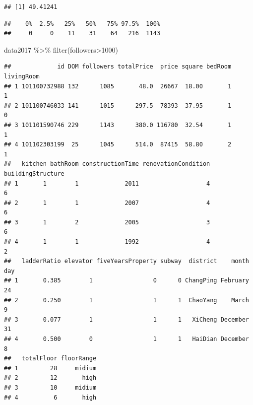 \documentclass[
]{article}
\newenvironment{Shaded}{\begin{snugshade}}{\end{snugshade}}
\newcommand{\DecValTok}[1]{\textcolor[rgb]{0.00,0.00,0.81}{#1}}
\newcommand{\FloatTok}[1]{\textcolor[rgb]{0.00,0.00,0.81}{#1}}
\newcommand{\FunctionTok}[1]{\textcolor[rgb]{0.00,0.00,0.00}{#1}}
\newcommand{\NormalTok}[1]{#1}
\newcommand{\SpecialCharTok}[1]{\textcolor[rgb]{0.00,0.00,0.00}{#1}}
\begin{document}
\begin{Shaded}
\end{Shaded}

\begin{verbatim}
## [1] 49.41241
\end{verbatim}

\begin{Shaded}
\end{Shaded}

\begin{verbatim}
##    0%  2.5%   25%   50%   75% 97.5%  100% 
##     0     0    11    31    64   216  1143
\end{verbatim}

\begin{Shaded}
\begin{Highlighting}[]
\NormalTok{data2017 }\SpecialCharTok{\%\textgreater{}\%} \FunctionTok{filter}\NormalTok{(followers}\SpecialCharTok{\textgreater{}}\DecValTok{1000}\NormalTok{)}
\end{Highlighting}
\end{Shaded}

\begin{verbatim}
##             id DOM followers totalPrice  price square bedRoom livingRoom
## 1 101100732988 132      1085       48.0  26667  18.00       1          1
## 2 101100746033 141      1015      297.5  78393  37.95       1          0
## 3 101101590746 229      1143      380.0 116780  32.54       1          1
## 4 101102303199  25      1045      514.0  87415  58.80       2          1
##   kitchen bathRoom constructionTime renovationCondition buildingStructure
## 1       1        1             2011                   4                 6
## 2       1        1             2007                   4                 6
## 3       1        2             2005                   3                 6
## 4       1        1             1992                   4                 2
##   ladderRatio elevator fiveYearsProperty subway  district    month day
## 1       0.385        1                 0      0 ChangPing February  24
## 2       0.250        1                 1      1  ChaoYang    March   9
## 3       0.077        1                 1      1   XiCheng December  31
## 4       0.500        0                 1      1   HaiDian December   8
##   totalFloor floorRange
## 1         28     midium
## 2         12       high
## 3         10     midium
## 4          6       high
\end{verbatim}
\end{document}
